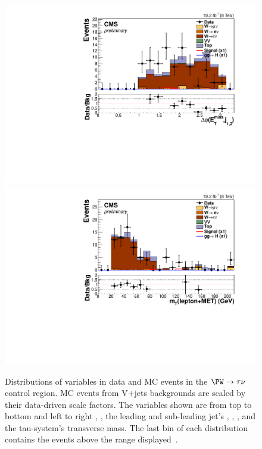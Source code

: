 \begin{figure}
  \includegraphics[width=.65\largefigwidth]{plots/parked/HIG-14-038-figs/output_sigreg/taunu_jetmetnomu_mindphi.pdf}
  \includegraphics[width=.65\largefigwidth]{plots/parked/HIG-14-038-figs/output_sigreg/taunu_lep_mt.pdf}
  \caption{Distributions of variables in data and MC events in the $\PW\rightarrow \tau\nu$ control region. MC events from V+jets backgrounds are scaled by their data-driven scale factors. The variables shown are from top to bottom and left to right \detajj, \Mjj, the leading and sub-leading jet's \pt, \METnoMU, \METsig, \jetmetdphileading and the tau-\MET system's transverse mass. The last bin of each distribution contains the events above the range displayed~\cite{CMS-PAS-HIG-14-038}.}
  \label{fig:parkedwtaunu}
\end{figure}

